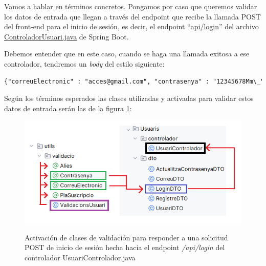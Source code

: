 \documentclass[a4paper,12pt]{report}
\begin{document}
			
			Vamos a hablar en términos concretos. Pongamos por caso que queremos validar los datos de entrada que llegan a través del endpoint que recibe la llamada POST del front-end para el inicio de sesión, es decir, el endpoint ``\href{https://github.com/blackcub3s/mercApp/blob/4ddc34194763af7a246ffabb14146ad9b4b2c5db/APP%20WEB/__springboot__produccio__/app/src/main/java/miApp/app/Usuaris/controlador/UsuariControlador.java#L103}{api/login}'' del archivo \href{https://github.com/blackcub3s/mercApp/blob/main/APP%20WEB/__springboot__produccio__/app/src/main/java/miApp/app/Usuaris/controlador/UsuariControlador.java}{ControladorUsuari.java} de Spring Boot. 
			
			Debemos entender que en este caso, cuando se haga una llamada exitosa a ese controlador, tendremos un \textit{body} del estilo siguiente:
			
				
			\begin{lstlisting}[language=xml, basicstyle=\ttfamily\footnotesize, keywordstyle=\color{magenta}]
{"correuElectronic" : "acces@gmail.com", "contrasenya" : "12345678Mm\_" }
			\end{lstlisting}
			
	
			

			
			Según los términos esperados las clases utilizadas y activadas para validar estos datos de entrada serán las de la figura \ref{fig:validacioBackArxiusDetallLoginVA}:
			
			
			
			\FloatBarrier
			\setlength{\belowcaptionskip}{3pt}
			\begin{figure}[H]
				\centering
				\caption{Activación de clases de validación para responder a una solicitud POST de inicio de sesión hecha hacia el endpoint \textit{/api/login} del controlador UsuariControlador.java}
				\includegraphics[width=1\linewidth]{img/validacioBackArxiusDetallLoginVA}
				\label{fig:validacioBackArxiusDetallLoginVA}
			\end{figure}
			\FloatBarrier
			
\end{document}

